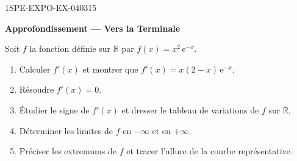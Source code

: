 \begin{exercice}{1SPE-EXPO-EX-040}{3}{15}
\begin{center}\textbf{Approfondissement — Vers la Terminale}\end{center}
Soit $f$ la fonction définie sur $\mathbb{R}$ par $f(x) = x^2\,\mathrm{e}^{-x}$.

\begin{enumerate}
\item Calculer $f'(x)$ et montrer que $f'(x) = x(2-x)\,\mathrm{e}^{-x}$.
\item Résoudre $f'(x) = 0$.
\item Étudier le signe de $f'(x)$ et dresser le tableau de variations de $f$ sur $\mathbb{R}$.
\item Déterminer les limites de $f$ en $-\infty$ et en $+\infty$.
\item Préciser les extremums de $f$ et tracer l'allure de la courbe représentative.
\end{enumerate}
\end{exercice}
